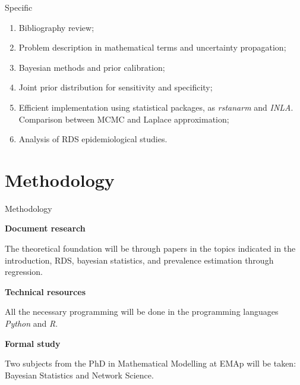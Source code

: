 \documentclass{beamer}
\newcommand{\Space}{\vspace{3ex}}
\begin{document}
\begin{frame}{Specific}

  \begin{enumerate}
    \item Bibliography review; 

    \item Problem description in mathematical terms and uncertainty propagation; 

    \item Bayesian methods and prior calibration; 

    \item Joint prior distribution for sensitivity and specificity;

    \item Efficient implementation using statistical packages, as {\em
    rstanarm} and {\em INLA}. Comparison between MCMC and Laplace
    approximation; 

    \item Analysis of RDS epidemiological studies.
  \end{enumerate}
  
\end{frame}



\section{Methodology}


\begin{frame}{Methodology}

{\bf Document research}

The theoretical foundation will be through papers in the topics indicated in
the introduction, RDS, bayesian statistics, and prevalence estimation through
regression. 

\Space

{\bf Technical resources}

All the necessary programming will be done in the programming languages
\textit{Python} and \textit{R}. 

\Space

{\bf Formal study}

Two subjects from the PhD in Mathematical Modelling at EMAp will be taken:
Bayesian Statistics and Network Science.

\end{frame}
\end{document}
